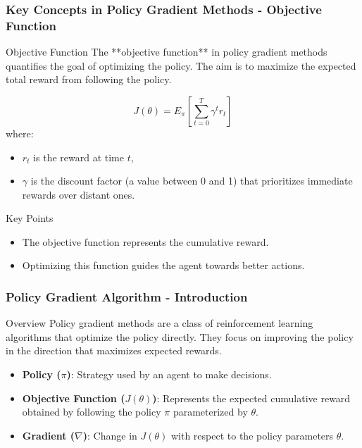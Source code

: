 \documentclass[aspectratio=169]{beamer}
\begin{document}
\begin{frame}[fragile]
    \frametitle{Key Concepts in Policy Gradient Methods - Objective Function}
    \begin{block}{Objective Function}
        The **objective function** in policy gradient methods quantifies the goal of optimizing the policy. 
        The aim is to maximize the expected total reward from following the policy.
    \end{block}

    \begin{equation}
    J(\theta) = E_\pi \left[ \sum_{t=0}^{T} \gamma^t r_t \right]
    \end{equation}
    where:
    \begin{itemize}
        \item \( r_t \) is the reward at time \( t \),
        \item \( \gamma \) is the discount factor (a value between 0 and 1) that prioritizes immediate rewards over distant ones.
    \end{itemize}

    \begin{block}{Key Points}
        \begin{itemize}
            \item The objective function represents the cumulative reward.
            \item Optimizing this function guides the agent towards better actions.
        \end{itemize}
    \end{block}
\end{frame}

\begin{frame}[fragile]
    \frametitle{Policy Gradient Algorithm - Introduction}
    \begin{block}{Overview}
        Policy gradient methods are a class of reinforcement learning algorithms that optimize the policy directly. They focus on improving the policy in the direction that maximizes expected rewards.
    \end{block}
    
    \begin{itemize}
        \item \textbf{Policy ($\pi$)}: Strategy used by an agent to make decisions.
        \item \textbf{Objective Function ($J(\theta)$)}: Represents the expected cumulative reward obtained by following the policy $\pi$ parameterized by $\theta$.
        \item \textbf{Gradient ($\nabla$)}: Change in $J(\theta)$ with respect to the policy parameters $\theta$.
    \end{itemize}
\end{frame}
\end{document}
